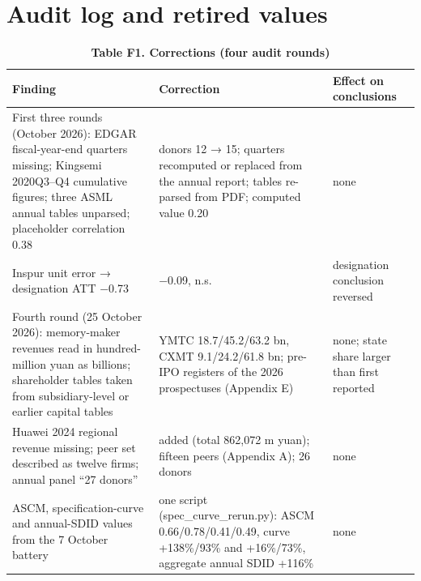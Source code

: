 \documentclass[12pt]{article}
\begin{document}
\FloatBarrier{}
\section{Audit log and retired values}


\begin{table}[htbp]\scriptsize\centering\footnotesize{}\caption*{\textbf{Table F1. Corrections (four audit rounds)}}\begin{tabular}{@{}
  >{\raggedright\arraybackslash}p{}
  >{\raggedright\arraybackslash}p{}
  >{\raggedright\arraybackslash}p{}@{}}
\toprule
\begin{minipage}[b]{\linewidth}\raggedright
Finding
\end{minipage} & \begin{minipage}[b]{\linewidth}\raggedright
Correction
\end{minipage} & \begin{minipage}[b]{\linewidth}\raggedright
Effect on conclusions
\end{minipage} \\
\midrule
First three rounds (October 2026): EDGAR fiscal-year-end quarters missing; Kingsemi 2020Q3--Q4 cumulative figures; three ASML annual tables unparsed; placeholder correlation 0.38 & donors 12 → 15; quarters recomputed or replaced from the annual report; tables re-parsed from PDF; computed value 0.20 & none \\
\hdashline
Inspur unit error → designation ATT −0.73 & −0.09, n.s. & designation conclusion reversed \\
\hdashline
Fourth round (25 October 2026): memory-maker revenues read in hundred-million yuan as billions; shareholder tables taken from subsidiary-level or earlier capital tables & YMTC 18.7/45.2/63.2 bn, CXMT 9.1/24.2/61.8 bn; pre-IPO registers of the 2026 prospectuses (Appendix E) & none; state share larger than first reported \\
\hdashline
Huawei 2024 regional revenue missing; peer set described as twelve firms; annual panel ``27 donors'' & 2024 added (total 862,072 m yuan); fifteen peers (Appendix A); 26 donors & none \\
\hdashline
ASCM, specification-curve and annual-SDID values from the 7 October battery & one script (spec\_curve\_rerun.py): ASCM 0.66/0.78/0.41/0.49, curve +138\%/93\% and +16\%/73\%, aggregate annual SDID +116\% & none \\

\end{tabular}
\end{table}
\end{document}
